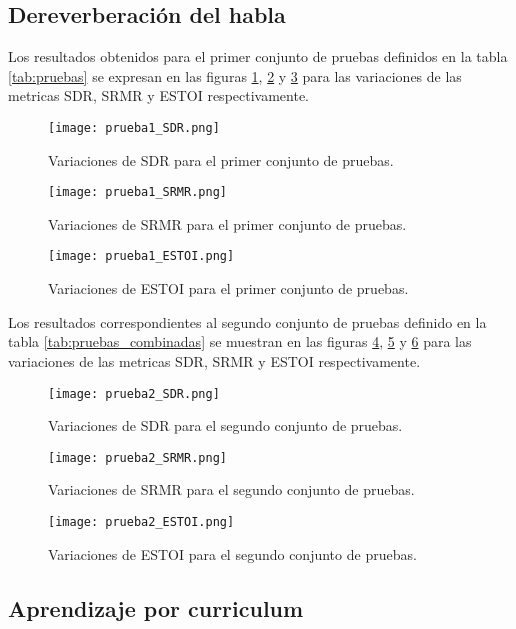 \subsection{Dereverberación del habla}

Los resultados obtenidos para el primer conjunto de pruebas definidos en la tabla \ref{tab:pruebas} se expresan en las figuras \ref{fig:1_SDR}, \ref{fig:1_SRMR} y \ref{fig:1_ESTOI} para las variaciones de las metricas SDR, SRMR y ESTOI respectivamente. 

\begin{figure}[H]
	\centering{}
	\texttt{[image: prueba1\_SDR.png]}
	\caption{Variaciones de SDR para el primer conjunto de pruebas.}
	\label{fig:1_SDR}
\end{figure}

\begin{figure}[H]
	\centering{}
	\texttt{[image: prueba1\_SRMR.png]}
	\caption{Variaciones de SRMR para el primer conjunto de pruebas.}
	\label{fig:1_SRMR}
\end{figure}

\begin{figure}[H]
	\centering{}
	\texttt{[image: prueba1\_ESTOI.png]}
	\caption{Variaciones de ESTOI para el primer conjunto de pruebas.}
	\label{fig:1_ESTOI}
\end{figure}

Los resultados correspondientes al segundo conjunto de pruebas definido en la tabla \ref{tab:pruebas_combinadas} se muestran en las figuras \ref{fig:2_SDR}, \ref{fig:2_SRMR} y \ref{fig:2_ESTOI} para las variaciones de las metricas SDR, SRMR y ESTOI respectivamente.

\begin{figure}[H]
	\centering{}
	\texttt{[image: prueba2\_SDR.png]}
	\caption{Variaciones de SDR para el segundo conjunto de pruebas.}
	\label{fig:2_SDR}
\end{figure}

\begin{figure}[H]
	\centering{}
	\texttt{[image: prueba2\_SRMR.png]}
	\caption{Variaciones de SRMR para el segundo conjunto de pruebas.}
	\label{fig:2_SRMR}
\end{figure}

\begin{figure}[H]
	\centering{}
	\texttt{[image: prueba2\_ESTOI.png]}
	\caption{Variaciones de ESTOI para el segundo conjunto de pruebas.}
	\label{fig:2_ESTOI}
\end{figure}

\subsection{Aprendizaje por curriculum}
